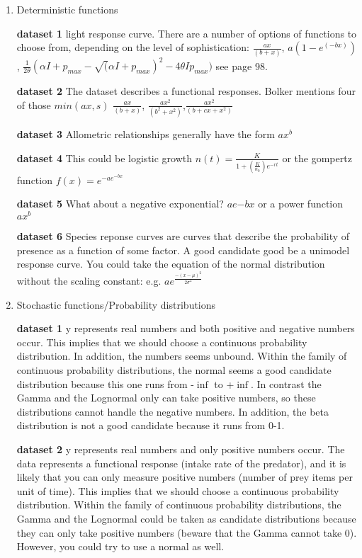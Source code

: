 \documentclass[]{article}
\begin{document}
\begin{enumerate}
\def\labelenumi{\arabic{enumi}.}
\item
  Deterministic functions

  \textbf{dataset 1} light response curve. There are a number of options
  of functions to choose from, depending on the level of sophistication:
  \(\frac{ax}{(b+x)}\), \(a(1-e^{(-bx)})\),
  \(\frac{1}{2\theta}(\alpha I+p_{max}-\sqrt(\alpha I+p_{max})^2-4\theta I p_{max})\)
  see page 98.

  \textbf{dataset 2} The dataset describes a functional responses.
  Bolker mentions four of those \(min(ax,s)\) \(\frac{ax}{(b+x)}\),
  \(\frac{ax^2}{(b^2+x^2)}\),\(\frac{ax^2}{(b+cx+x^2)}\)

  \textbf{dataset 3} Allometric relationships generally have the form
  \(ax^b\)

  \textbf{dataset 4} This could be logistic growth
  \(n(t)=\frac{K}{1+(\frac{K}{n_0})e^{-rt}}\) or the gompertz function
  \(f(x)=e^{-ae^{-bx}}\)

  \textbf{dataset 5} What about a negative exponential? \(ae{-bx}\) or a
  power function \(ax^b\)

  \textbf{dataset 6} Species reponse curves are curves that describe the
  probability of presence as a function of some factor. A good candidate
  good be a unimodel response curve. You could take the equation of the
  normal distribution without the scaling constant: e.g.
  \(a e^{\frac{-(x-\mu)^2}{2\sigma^2}}\)
\item
  Stochastic functions/Probability distributions

  \textbf{dataset 1} y represents real numbers and both positive and
  negative numbers occur. This implies that we should choose a
  continuous probability distribution. In addition, the numbers seems
  unbound. Within the family of continuous probability distributions,
  the normal seems a good candidate distribution because this one runs
  from -\(\inf\) to +\(\inf\). In contrast the Gamma and the Lognormal
  only can take positive numbers, so these distributions cannot handle
  the negative numbers. In addition, the beta distribution is not a good
  candidate because it runs from 0-1.

  \textbf{dataset 2} y represents real numbers and only positive numbers
  occur. The data represents a functional response (intake rate of the
  predator), and it is likely that you can only measure positive numbers
  (number of prey items per unit of time). This implies that we should
  choose a continuous probability distribution. Within the family of
  continuous probability distributions, the Gamma and the Lognormal
  could be taken as candidate distributions because they can only take
  positive numbers (beware that the Gamma cannot take 0). However, you
  could try to use a normal as well.


\end{enumerate}
\end{document}

